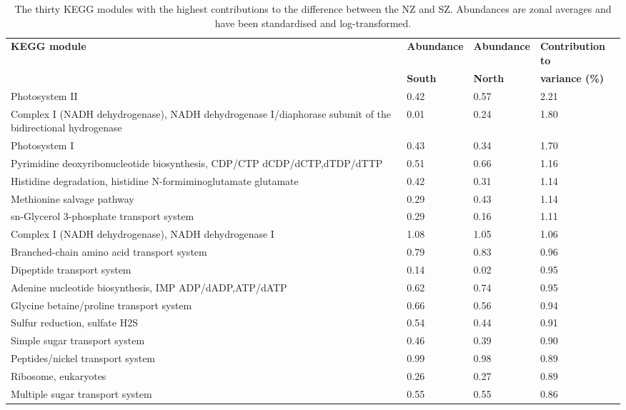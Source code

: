 \begin{sidewaystable}
\sffamily
\begin{center}
\caption[Contributions of KEGG modules to variance between the North and South zones]{\sffamily{}The thirty \ac{KEGG} modules with the highest contributions to the difference between the \ac{NZ} and \ac{SZ}.
Abundances are zonal averages and have been standardised and log-transformed.
}
\label{tab:modulessimper}
\begin{tabularx}{\textwidth}{Xlll}
\toprule
\textbf{\ac{KEGG} module} & \textbf{Abundance} & \textbf{Abundance} & \textbf{Contribution to}\\
& \textbf{South} & \textbf{North} & \textbf{variance (\%)}\\
\midrule
Photosystem II & 0.42 & 0.57 & 2.21\\
Complex I (NADH dehydrogenase), NADH dehydrogenase I/diaphorase subunit of the bidirectional hydrogenase & 0.01 & 0.24 & 1.80\\
Photosystem I & 0.43 & 0.34 & 1.70\\
Pyrimidine deoxyribonucleotide biosynthesis, CDP/CTP \textrightarrow{} dCDP/dCTP,dTDP/dTTP & 0.51 & 0.66 & 1.16\\
Histidine degradation, histidine \textrightarrow{} N-formiminoglutamate \textrightarrow{} glutamate & 0.42 & 0.31 & 1.14\\
Methionine salvage pathway & 0.29 & 0.43 & 1.14\\
sn-Glycerol 3-phosphate transport system & 0.29 & 0.16 & 1.11\\
Complex I (NADH dehydrogenase), NADH dehydrogenase I & 1.08 & 1.05 & 1.06\\
Branched-chain amino acid transport system & 0.79 & 0.83 & 0.96\\
Dipeptide transport system & 0.14 & 0.02 & 0.95\\
Adenine nucleotide biosynthesis, IMP \textrightarrow{} ADP/dADP,ATP/dATP & 0.62 & 0.74 & 0.95\\
Glycine betaine/proline transport system & 0.66 & 0.56 & 0.94\\
Sulfur reduction, sulfate \textrightarrow{} H2S & 0.54 & 0.44 & 0.91\\
Simple sugar transport system & 0.46 & 0.39 & 0.90\\
Peptides/nickel transport system & 0.99 & 0.98 & 0.89\\
Ribosome, eukaryotes & 0.26 & 0.27 & 0.89\\
Multiple sugar transport system & 0.55 & 0.55 & 0.86\\

\end{tabularx}
\end{center}
\end{sidewaystable}

